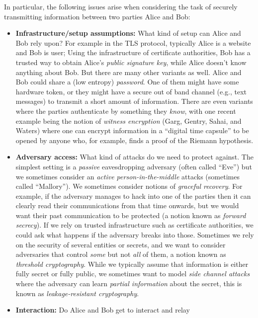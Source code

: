 In particular, the following issues arise when considering the task of
securely transmitting information between two parties Alice and Bob:

\begin{itemize}
\item
  \textbf{Infrastructure/setup assumptions:} What kind of setup can
  Alice and Bob rely upon? For example in the TLS protocol, typically
  Alice is a website and Bob is user; Using the infrastructure of
  certificate authorities, Bob has a trusted way to obtain Alice's
  \emph{public signature key}, while Alice doesn't know anything about
  Bob. But there are many other variants as well. Alice and Bob could
  share a (low entropy) \emph{password}. One of them might have some
  hardware token, or they might have a secure out of band channel (e.g.,
  text messages) to transmit a short amount of information. There are
  even variants where the parties authenticate by something they
  \emph{know}, with one recent example being the notion of \emph{witness
  encryption} (Garg, Gentry, Sahai, and Waters) where one can encrypt
  information in a ``digital time capsule'' to be opened by anyone who,
  for example, finds a proof of the Riemann hypothesis.
\item
  \textbf{Adversary access:} What kind of attacks do we need to protect
  against. The simplest setting is a \emph{passive} eavesdropping
  adversary (often called ``Eve'') but we sometimes consider an
  \emph{active person-in-the-middle} attacks (sometimes called
  ``Mallory''). We sometimes consider notions of \emph{graceful
  recovery}. For example, if the adversary manages to hack into one of
  the parties then it can clearly read their communications from that
  time onwards, but we would want their past communication to be
  protected (a notion known as \emph{forward secrecy}). If we rely on
  trusted infrastructure such as certificate authorities, we could ask
  what happens if the adversary breaks into those. Sometimes we rely on
  the security of several entities or secrets, and we want to consider
  adversaries that control \emph{some} but not \emph{all} of them, a
  notion known as \emph{threshold cryptography}. While we typically
  assume that information is either fully secret or fully public, we
  sometimes want to model \emph{side channel attacks} where the
  adversary can learn \emph{partial information} about the secret, this
  is known as \emph{leakage-resistant cryptography}.
\item
  \textbf{Interaction:} Do Alice and Bob get to interact and relay

\end{itemize}
